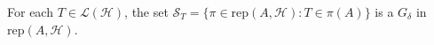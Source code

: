 For each $T \in \mathcal{L}(\mathcal{H})$, the set $\mathcal{S}_T = \{\pi \in \text{rep}(A, \mathcal{H}) : T \in \pi(A)\}$ is a $G_\delta$ in $\text{rep}(A, \mathcal{H})$.

